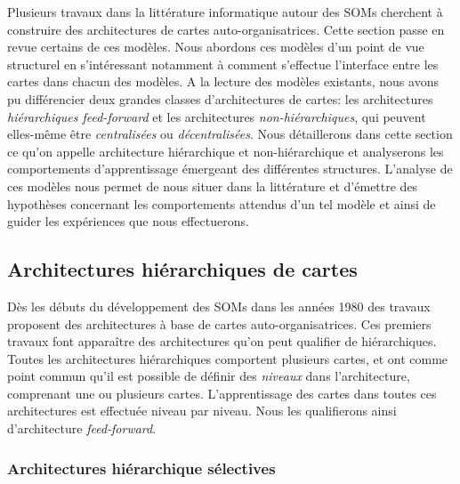 \documentclass[../main]{subfiles}
\begin{document}
Plusieurs travaux dans la littérature informatique autour des SOMs cherchent à construire des architectures de cartes auto-organisatrices.
Cette section passe en revue certains de ces modèles.
Nous abordons ces modèles d'un point de vue structurel en s'intéressant notamment à comment s'effectue l'interface entre les cartes dans chacun des modèles. A la lecture des modèles existants, nous avons pu différencier deux grandes classes d'architectures de cartes: les architectures \emph{hiérarchiques feed-forward} et  les architectures \emph{non-hiérarchiques}, qui peuvent elles-même être \emph{centralisées} ou \emph{décentralisées}.
Nous détaillerons dans cette section ce qu'on appelle architecture hiérarchique et non-hiérarchique et analyserons les comportements d'apprentissage émergeant des différentes structures. L'analyse de ces modèles nous permet de nous situer dans la littérature et d'émettre des hypothèses concernant les comportements attendus d'un tel modèle et ainsi de guider les expériences que nous effectuerons.

\subsection{Architectures hiérarchiques de cartes}

Dès les débuts du développement des SOMs dans les années 1980 des travaux proposent des architectures à base de cartes auto-organisatrices. Ces premiers travaux font apparaître des architectures qu'on peut qualifier de hiérarchiques.
Toutes les architectures hiérarchiques comportent plusieurs cartes, et ont comme point commun qu'il est possible de définir des \emph{niveaux} dans l'architecture, comprenant une ou plusieurs cartes. L'apprentissage des cartes dans toutes ces architectures est effectuée niveau par niveau. Nous les qualifierons ainsi d'architecture \emph{feed-forward}. 

\subsubsection{Architectures hiérarchique sélectives}
\end{document}
